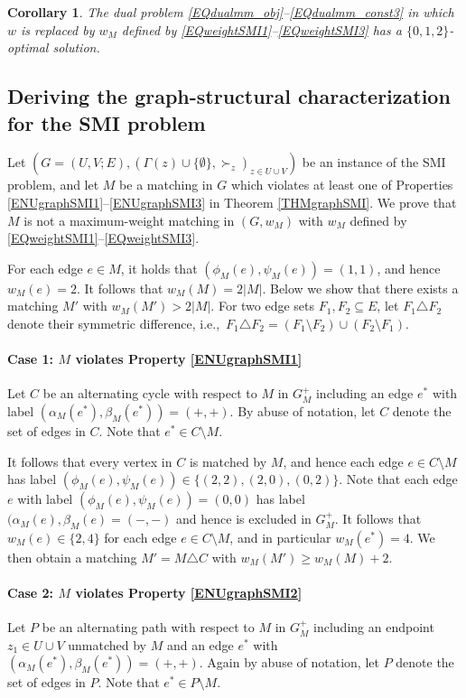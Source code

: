 \documentclass[11pt,a4paper,showkeys]{article}
\theoremstyle{plain}
\newtheorem{corollary}[theorem]{Corollary}
\theoremstyle{definition}
\begin{document}
\begin{corollary}
    \label{CORSMI}
    The dual problem \eqref{EQdualmm_obj}--\eqref{EQdualmm_const3} in which $w$ is replaced by $w_M$ defined by \eqref{EQweightSMI1}--\eqref{EQweightSMI3} has a $\{0,1,2\}$-optimal solution. 
\end{corollary}


\subsection{Deriving the graph-structural characterization for the SMI problem}

Let $(G=(U,V;E),(\Gamma(z)\cup \{\emptyset\},\succ_z)_{z\in U\cup V})$ be an instance of the SMI problem, 
and let $M$ be a matching in $G$ which violates at least one of Properties \ref{ENUgraphSMI1}--\ref{ENUgraphSMI3} 
in Theorem \ref{THMgraphSMI}. 
We prove that $M$ is not a maximum-weight matching in $(G, w_M)$ with $w_M$ defined by \eqref{EQweightSMI1}--\eqref{EQweightSMI3}. 

For each edge $e\in M$, 
it holds that $(\phi_M(e),\psi_M(e))=(1,1)$, and hence $w_M(e)=2$. 
It follows that $w_M(M)=2|M|$. 
Below we show that there exists a matching $M'$ with $w_M(M') > 2|M|$. 
For two edge sets $F_1,F_2\subseteq E$, 
let $F_1\triangle F_2$ denote their symmetric difference, 
i.e.,\ 
$F_1\triangle F_2=(F_1\setminus F_2) \cup (F_2\setminus F_1)$. 

\paragraph{Case 1: $M$ violates Property \ref{ENUgraphSMI1}}
Let $C$ be an alternating cycle with respect to $M$ in $G_M^+$ 
including an edge $e^*$ with label $(\alpha_M(e^*),\beta_M(e^*))=(+,+)$. 
By abuse of notation, 
let $C$ denote the set of edges in $C$. 
Note that $e^*\in C\setminus M$. 

It follows that every vertex in $C$ is matched by $M$, 
and hence each edge $e \in C\setminus M$ has label $(\phi_M(e),\psi_M(e))\in \{(2,2),(2,0),(0,2)\}$. 
Note that each edge $e$ with label $(\phi_M(e),\psi_M(e))=(0,0)$ has label $(\alpha_M(e),\beta_M(e)=(-,-)$ and hence is excluded in $G_M^+$. 
It follows that $w_M(e)\in \{2,4\}$ for each edge $e \in C\setminus M$, 
and in particular $w_M(e^*)=4$. 
We then obtain a matching $M' = M \triangle C$ 
with $w_M(M') \ge w_M(M)+2$. 


\paragraph{Case 2: $M$ violates Property \ref{ENUgraphSMI2}}
Let $P$ be an alternating path with respect to $M$ in $G_M^+$ 
including an endpoint $z_1\in U\cup V$ unmatched by $M$ and an edge $e^*$ with $(\alpha_M(e^*),\beta_M(e^*))=(+,+)$. 
Again by abuse of notation, 
let $P$ denote the set of edges in $P$. 
Note that 
$e^*\in P\setminus M$. 
\end{document}
